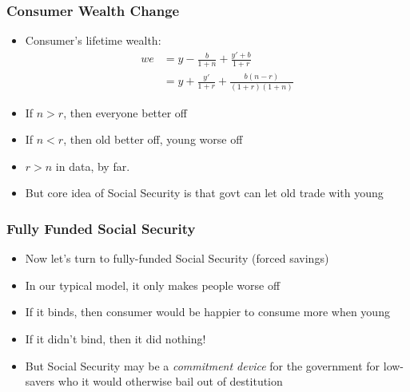 \documentclass{beamer}
\begin{document}
 \begin{frame}
\frametitle[alignment=center]{Consumer Wealth Change}
\begin{itemize}
\item Consumer's lifetime wealth:
\begin{align*}
we & =y-\frac{b}{1+n}+\frac{y'+b}{1+r}\\
 & = y+\frac{y'}{1+r}+\frac{b(n-r)}{(1+r)(1+n)}
\end{align*}
\item If $n>r$, then everyone better off
\bigskip
\item If $n<r$, then old better off, young worse off
\bigskip
\item $r>n$ in data, by far.
\bigskip
\item But core idea of Social Security is that govt can let old trade with young
\end{itemize}
 \end{frame}

 \begin{frame}
\frametitle[alignment=center]{Fully Funded Social Security}
\begin{itemize}
\item Now let's turn to fully-funded Social Security (forced savings)
\bigskip
\item In our typical model, it only makes people worse off
\bigskip
\item If it binds, then consumer would be happier to consume more when young
\bigskip
\item If it didn't bind, then it did nothing!
\bigskip
\item But Social Security may be a \emph{commitment device} for the government for low-savers who it would otherwise bail out of destitution
\end{itemize}
 \end{frame}
\end{document}
